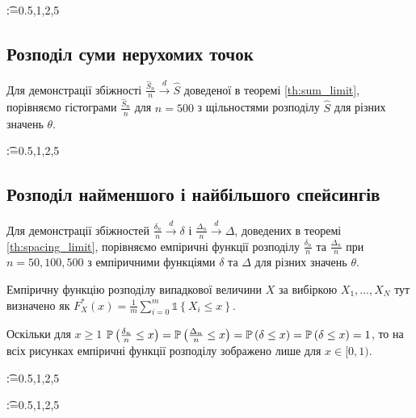 \makeatletter
    \@for\t:={0.5,1,2,5}
\makeatother

\subsection{Розподіл суми нерухомих точок}
Для демонстрації збіжності
$\frac{\widehat{S}_n}{n} \overset{d}{\longrightarrow} \widehat{S}$
доведеної в теоремі \ref{th:sum_limit}, порівняємо
гістограми $\frac{\widehat{S}_n}{n}$
для $n = 500$ з щільностями розподілу $\widehat{S}$
для різних значень $\theta$.

\makeatletter
    \@for\t:={0.5,1,2,5}
\makeatother

\subsection{Розподіл найменшого і найбільшого спейсингів}
Для демонстрації збіжностей
$\frac{\delta_n}{n} \overset{d}{\longrightarrow} \delta$ і
$\frac{\Delta_n}{n} \overset{d}{\longrightarrow} \Delta$,
доведених в теоремі \ref{th:spacing_limit}, порівняємо
емпіричні функції розподілу $\frac{\delta_n}{n}$ та $\frac{\Delta_n}{n}$
при $n = 50, 100, 500$ з емпіричними функціями $\delta$ та $\Delta$
для різних значень $\theta$.

Емпіричну функцію розподілу випадкової величини $X$ за вибіркою
$X_1, ..., X_N$ тут визначено як 
$F^*_X(x) = \frac{1}{m} \sum_{i=0}^{m} \mathds{1}\left\{X_i \leq x\right\}$.

Оскільки для $x \geq 1$ 
$\P{\frac{\delta_n}{n} \leq x} = \P{\frac{\Delta_n}{n} \leq x} = \P{\delta \leq x} = \P{\delta \leq x} = 1$,
то на всіх рисунках емпіричні функції розподілу зображено лише для $x \in [0, 1)$.

\makeatletter
    \@for\t:={0.5,1,2,5}
\makeatother

\makeatletter
    \@for\t:={0.5,1,2,5}
\makeatother